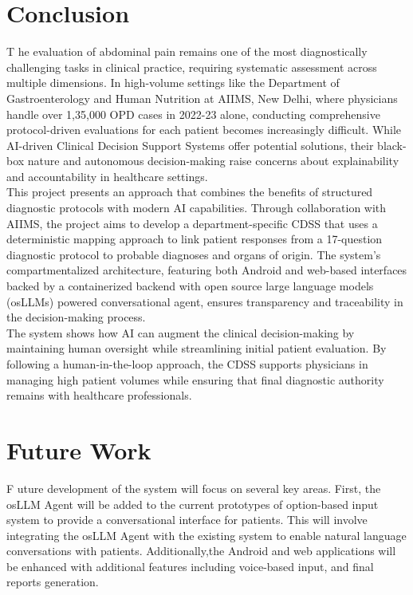 \section{Conclusion}
\lettrine{T}{ }he evaluation of abdominal pain remains one of the most diagnostically challenging tasks in clinical practice, requiring systematic assessment across multiple dimensions. In high-volume settings like the Department of Gastroenterology and Human Nutrition at AIIMS, New Delhi, where physicians handle over 1,35,000 OPD cases in 2022-23 alone, conducting comprehensive protocol-driven evaluations for each patient becomes increasingly difficult. While AI-driven Clinical Decision Support Systems offer potential solutions, their black-box nature and autonomous decision-making raise concerns about explainability and accountability in healthcare settings.\\[\baselineskip]

\noindent This project presents an approach that combines the benefits of structured diagnostic protocols with modern AI capabilities. Through collaboration with AIIMS, the project aims to develop a department-specific CDSS that uses a deterministic mapping approach to link patient responses from a 17-question diagnostic protocol to probable diagnoses and organs of origin. The system's compartmentalized architecture, featuring both Android and web-based interfaces backed by a containerized backend with open source large language models (osLLMs) powered conversational agent, ensures transparency and traceability in the decision-making process.\\[\baselineskip]

\noindent The system shows how AI can augment the clinical decision-making by maintaining human oversight while streamlining initial patient evaluation. By following a human-in-the-loop approach, the CDSS supports physicians in managing high patient volumes while ensuring that final diagnostic authority remains with healthcare professionals. 

\section{Future Work}
\lettrine{F}{ }uture development of the system will focus on several key areas. First, the osLLM Agent will be added to the current prototypes of option-based input system to provide a conversational interface for patients. This will involve integrating the osLLM Agent with the existing system to enable natural language conversations with patients. Additionally,the Android and web applications will be enhanced with additional features including voice-based input, and final reports generation.\\[\baselineskip]

